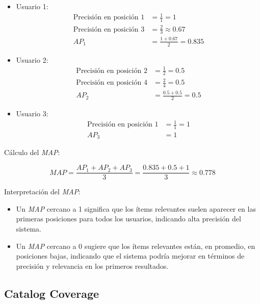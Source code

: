 \documentclass[11pt,a4paper,twoside]{thesis}
\begin{document}
\begin{itemize}
	\item Usuario 1:
	      \begin{align*}
		      \text{Precisión en posición 1} & = \frac{1}{1} = 1            \\
		      \text{Precisión en posición 3} & = \frac{2}{3} \approx 0.67   \\
		      AP_1                           & = \frac{1 + 0.67}{2} = 0.835
	      \end{align*}

	\item Usuario 2:
	      \begin{align*}
		      \text{Precisión en posición 2} & = \frac{1}{2} = 0.5         \\
		      \text{Precisión en posición 4} & = \frac{2}{4} = 0.5         \\
		      AP_2                           & = \frac{0.5 + 0.5}{2} = 0.5
	      \end{align*}

	\item Usuario 3:
	      \begin{align*}
		      \text{Precisión en posición 1} & = \frac{1}{1} = 1 \\
		      AP_3                           & = 1
	      \end{align*}
\end{itemize}

Cálculo del \textit{MAP}:

\[
	MAP = \frac{AP_1 + AP_2 + AP_3}{3} = \frac{0.835 + 0.5 + 1}{3} \approx 0.778
\]

Interpretación del \textit{MAP}:

\begin{itemize}
	\item Un \textit{MAP} cercano a 1 significa que los ítems relevantes suelen aparecer en las primeras posiciones para todos los usuarios, indicando alta precisión del sistema.
	\item Un \textit{MAP} cercano a 0 sugiere que los ítems relevantes están, en promedio, en posiciones bajas, indicando que el sistema podría mejorar en términos de precisión y relevancia en los primeros resultados.
\end{itemize}


\subsection{Catalog Coverage}
\end{document}
